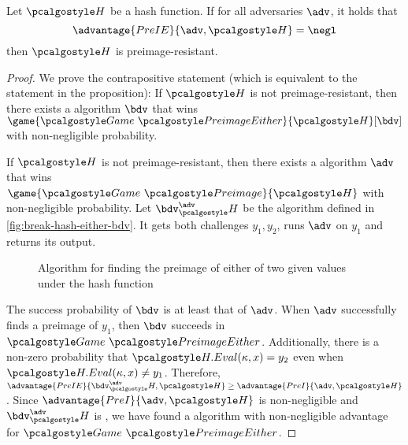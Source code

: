 \begin{proposition}
  Let $\algo{H}$ be a hash function. If for all \ppt adversaries $\adv$, it holds that
  \[
  \advantage{PreIE}{\adv, \algo{H}} = \negl
  \]
  then $\algo{H}$ is preimage-resistant.
\end{proposition}
\begin{proof}
  We prove the contrapositive statement (which is equivalent to the statement in the proposition):
  If $\algo{H}$ is not preimage-resistant, then there exists a \ppt algorithm $\bdv$ that wins\\ $\game{\Game~\algo{PreimageEither}}{\algo{H}}[\bdv]$ with non-negligible probability.

  If $\algo{H}$ is not preimage-resistant, then there exists a \ppt algorithm $\adv$ that wins $\game{\Game~\algo{Preimage}}{\algo{H}}$ with non-negligible probability.
  Let $\bdv^\adv_\algo{H}$ be the algorithm defined in \autoref{fig:break-hash-either-bdv}.
  It gets both challenges $y_1, y_2$, runs $\adv$ on $y_1$ and returns its output.
  \begin{figure}[tbhp]
  \begin{center}
    \begin{tcolorbox}[width=5cm]
      \begin{pchstack}[center]
      \end{pchstack}
    \end{tcolorbox}
  \end{center}
  \caption{Algorithm for finding the preimage of either of two given values under the hash function \label{fig:break-hash-either-bdv}}
  \end{figure}

  The success probability of $\bdv$ is at least that of $\adv$.
  When $\adv$ successfully finds a preimage of $y_1$, then $\bdv$ succeeds in $\Game~\algo{PreimageEither}$.
  Additionally, there is a non-zero probability that $\algo{H.Eval}(\kappa, x) = y_2$ even when $\algo{H.Eval}(\kappa, x) \neq y_1$.
  Therefore, $\advantage{PreIE}{\bdv^\adv_\algo{H}, \algo{H}} \ge \advantage{PreI}{\adv, \algo{H}}$.
  Since $\advantage{PreI}{\adv, \algo{H}}$ is non-negligible and $\bdv^\adv_\algo{H}$ is \ppt, we have found a \ppt algorithm with non-negligible advantage for $\Game~\algo{PreimageEither}$.
\end{proof}

